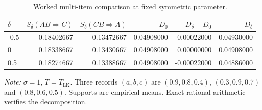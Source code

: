 \begin{table}[t]
\centering\color{red}
\caption{Worked multi-item comparison at fixed symmetric parameter.}
\label{tab:multiitem-worked}
\begin{tabular}{lrrrrr}
\toprule
$\delta$ & $S_\delta(AB\Rightarrow C)$ & $S_\delta(CB\Rightarrow A)$ & $D_0$ & $D_\delta-D_0$ & $D_\delta$ \\
\midrule
-0.5 & 0.18402667 & 0.13472667 & 0.04908000 & 0.00022000 & 0.04930000 \\
0 & 0.18338667 & 0.13430667 & 0.04908000 & 0.00000000 & 0.04908000 \\
0.5 & 0.18274667 & 0.13388667 & 0.04908000 & -0.00022000 & 0.04886000 \\
\bottomrule
\end{tabular}
\par\vspace{0.4ex}\footnotesize\emph{Note:} $\sigma=1$, $T=T_{\mathrm{LK}}$. Three records $(a,b,c)$ are $(0.9,0.8,0.4)$, $(0.3,0.9,0.7)$ and $(0.8,0.6,0.5)$. Supports are empirical means. Exact rational arithmetic verifies the decomposition.
\end{table}
